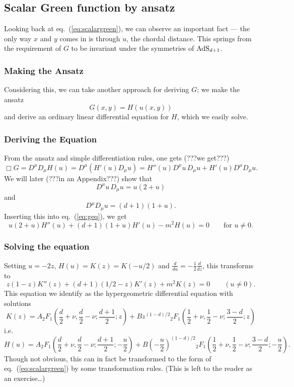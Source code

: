\subsection{Scalar Green function by ansatz}
Looking back at eq.~(\ref{eq:scalargreen}), we can observe an important fact --- the only way $x$ and $y$ comes in is through $u$, the chordal distance. This springs from the requirement of $G$ to be invariant under the symmetries of $\mathrm{AdS}_{d+1}$.

\subsubsection{Making the Ansatz}
Considering this, we can take another approach for deriving $G$; we make the ansatz
$$G(x,y)=H(u(x,y))$$
and derive an ordinary linear differential equation for $H$, which we easily solve.

\subsubsection{Deriving the Equation}
From the ansatz and simple differentiation rules, one gets (???we get???)
\begin{equation}\label{eq:boxg}
\Box G = D^\mu D_\mu H(u) = D^\mu (H'(u) D_\mu u) 
= H''(u) D^\mu u\, D_\mu u + H'(u) D^\mu D_\mu u.
\end{equation}
We will later (???in an Appendix???) show that
$$D^\mu u\, D_\mu u = u(2+u)$$
and
$$D^\mu D_\mu u = (d+1)(1+u).$$
Inserting this into eq.~(\ref{eq:geq}), we get
\begin{equation}\label{eq:Hode}
u(2+u) H''(u) + (d+1)(1+u) H'(u) - m^2 H(u) = 0\qquad\text{for $u \neq 0$}.
\end{equation}

\subsubsection{Solving the equation}
Setting $u=-2z$, $H(u)=K(z)=K(-u/2)$ and $\frac{d}{du}=-\frac12 \frac{d}{dz}$, this transforms to
$$z(1-z) K''(z) + (d+1)(1/2-z) K'(z) + m^2 K(z) = 0\qquad(u \neq 0).$$
This equation we identify as the hypergeometric differential equation with solutions
$$K(z) = A {}_2F_1(\frac{d}{2}+\nu, \frac{d}{2}-\nu; \frac{d+1}{2}; z) + B z^{(1-d)/2} {}_2F_1(\frac12+\nu, \frac12-\nu; \frac{3-d}{2}; z)$$
i.e.
$$H(u) = A {}_2F_1(\frac{d}{2}+\nu, \frac{d}{2}-\nu; \frac{d+1}{2}; -\frac{u}{2}) + B (-\frac{u}{2})^{(1-d)/2} {}_2F_1(\frac12+\nu, \frac12-\nu; \frac{3-d}{2}; -\frac{u}{2}).$$
Though not obvious, this can in fact be transformed to the form of eq.~(\ref{eq:scalargreen}) by some transformation rules. (This is left to the reader as an exercise\dots)
